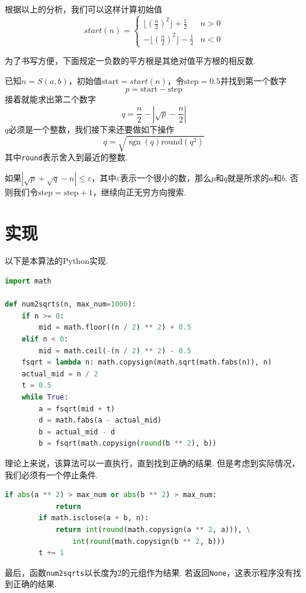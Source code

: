 \documentclass[a4paper, UTF8]{ctexart}
\DeclareMathOperator{\sgn}{\mathrm{sgn}}
\begin{document}
根据以上的分析，我们可以这样计算初始值
\[
    start(n)=
    \begin{cases}
        \lfloor(\frac{n}{2})^2\rfloor+\frac{1}{2}  &n>0 \\
        -\lfloor(\frac{n}{2})^2\rfloor-\frac{1}{2} &n<0
    \end{cases}
\]

为了书写方便，下面规定一负数的平方根是其绝对值平方根的相反数.

已知$n=S(a,b)$，初始值$\text{start}=start(n)$，令$\text{step}=0.5$并找到第一个数字\[p=\text{start}-\text{step}\]接着就能求出第二个数字\[q=\frac{n}{2}-|\sqrt{p}-\frac{n}{2}|\]$q$必须是一个整数，我们接下来还要做如下操作\[q=\sqrt{\sgn(q)\mathrm{round}(q^2)}\]其中\verb|round|表示舍入到最近的整数.

如果$|\sqrt{p}+\sqrt{q}-n|\leq\varepsilon$，其中$\varepsilon$表示一个很小的数，那么$p$和$q$就是所求的$a$和$b$. 否则我们令$\text{step}=\text{step}+1$，继续向正无穷方向搜索.

\section{实现}
以下是本算法的Python实现.

\begin{lstlisting}[language=python, name=example1]
import math

def num2sqrts(n, max_num=1000):
    if n >= 0:
        mid = math.floor((n / 2) ** 2) + 0.5
    elif n < 0:
        mid = math.ceil(-(n / 2) ** 2) - 0.5
    fsqrt = lambda n: math.copysign(math.sqrt(math.fabs(n)), n)
    actual_mid = n / 2
    t = 0.5
    while True:
        a = fsqrt(mid + t)
        d = math.fabs(a - actual_mid)
        b = actual_mid - d
        b = fsqrt(math.copysign(round(b ** 2), b))
\end{lstlisting}
理论上来说，该算法可以一直执行，直到找到正确的结果. 但是考虑到实际情况，我们必须有一个停止条件.
\begin{lstlisting}[language=python, name=example1]
        if abs(a ** 2) > max_num or abs(b ** 2) > max_num:
            return
        if math.isclose(a + b, n):
            return int(round(math.copysign(a ** 2, a))), \
                int(round(math.copysign(b ** 2, b)))
        t += 1
\end{lstlisting}
最后，函数\verb|num2sqrts|以长度为2的元组作为结果. 若返回\verb|None|，这表示程序没有找到正确的结果.
\end{document}
